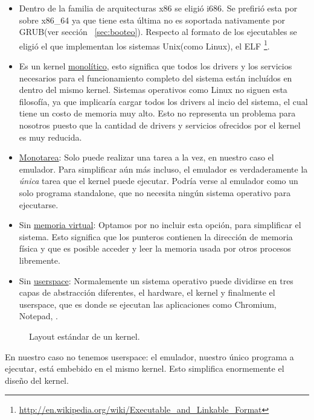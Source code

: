 \begin{itemize}
\item Dentro de la familia de arquitecturas x86 se eligió i686. Se prefirió esta por sobre x86\_64 ya que tiene esta última no es soportada nativamente por GRUB(ver sección ~\ref{sec:booteo}). Respecto al formato de los ejecutables se eligió el que implementan los sistemas Unix(como Linux), el ELF \footnote{\url{http://en.wikipedia.org/wiki/Executable_and_Linkable_Format}}.
\item Es un kernel \underline{monolítico}, esto significa que todos los drivers y los servicios necesarios para el funcionamiento completo del sistema están incluídos en dentro del mismo kernel. Sistemas operativos como Linux no siguen esta filosofía, ya que implicaría cargar todos los drivers al incio del sistema, el cual tiene un costo de memoria muy alto. Esto no representa un problema para nosotros puesto que la cantidad de drivers y servicios ofrecidos por el kernel es muy reducida.
\item \underline{Monotarea}: Solo puede realizar una tarea a la vez, en nuestro caso el emulador. Para simplificar aún más incluso, el emulador es verdaderamente la \emph{única} tarea que el kernel puede ejecutar. Podría verse al emulador como un solo programa standalone, que no necesita ningún sistema operativo para ejecutarse.
\item Sin \underline{memoria virtual}: Optamos por no incluir esta opción, para simplificar el sistema. Esto significa que los punteros contienen la dirección de memoria física y que es posible acceder y leer la memoria usada por otros procesos libremente.
\item Sin \underline{userspace}: Normalemente un sistema operativo puede dividirse en tres capas de abstracción diferentes, el hardware, el kernel y finalmente el userspace, que es donde se ejecutan las aplicaciones como Chromium, Notepad, \etc.
\end{itemize}
\begin{figure}[h]
\centering
\def\svgwidth{5cm}

\caption{Layout estándar de un kernel.}
\end{figure}
\FloatBarrier
En nuestro caso no tenemos userspace: el emulador, nuestro único programa a ejecutar, está embebido en el mismo kernel. Esto simplifica enormemente el diseño del kernel.

